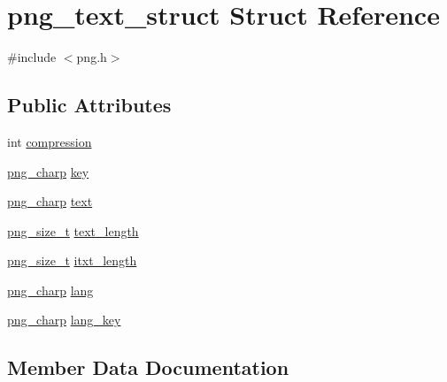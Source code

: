 \hypertarget{structpng__text__struct}{}\section{png\+\_\+text\+\_\+struct Struct Reference}
\label{structpng__text__struct}


{\ttfamily \#include $<$png.\+h$>$}

\subsection*{Public Attributes}
\begin{DoxyCompactItemize}
\item 
int \hyperlink{structpng__text__struct_ad09c73bc91f014ad352abfbb3b61b8d1}{compression}
\item 
\hyperlink{pngconf_8h_a0d08bb02251d02830803ff5d2d449750}{png\+\_\+charp} \hyperlink{structpng__text__struct_a99c3063a15889d2fc242f24b69c567ef}{key}
\item 
\hyperlink{pngconf_8h_a0d08bb02251d02830803ff5d2d449750}{png\+\_\+charp} \hyperlink{structpng__text__struct_a27492227bc525bee14abcc8002084edd}{text}
\item 
\hyperlink{pngconf_8h_a975e35d0a699ea3b08b8feef90fd29eb}{png\+\_\+size\+\_\+t} \hyperlink{structpng__text__struct_a26312284ecc7a95e2168a29d0170b411}{text\+\_\+length}
\item 
\hyperlink{pngconf_8h_a975e35d0a699ea3b08b8feef90fd29eb}{png\+\_\+size\+\_\+t} \hyperlink{structpng__text__struct_aca3fd6fec58f54460d57ad07182d570d}{itxt\+\_\+length}
\item 
\hyperlink{pngconf_8h_a0d08bb02251d02830803ff5d2d449750}{png\+\_\+charp} \hyperlink{structpng__text__struct_a803048cbecc84ca530d64db6513f4fc6}{lang}
\item 
\hyperlink{pngconf_8h_a0d08bb02251d02830803ff5d2d449750}{png\+\_\+charp} \hyperlink{structpng__text__struct_a61ee3cba011cf3bdefda49f8f9885482}{lang\+\_\+key}
\end{DoxyCompactItemize}


\subsection{Member Data Documentation}
\hypertarget{structpng__text__struct_ad09c73bc91f014ad352abfbb3b61b8d1}{}
